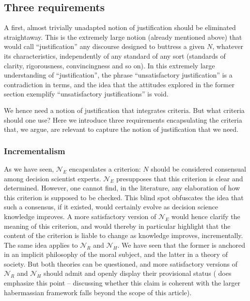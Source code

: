 \documentclass[preprint, french, english, 11pt, authoryear]{elsarticle}%
\begin{document}
\subsection{Three requirements}
A first, almost trivially unadapted notion of justification should be eliminated straightaway. This is the extremely large notion (already mentioned above) that would call ``justification'' any discourse designed to buttress a given $N$, whatever its characteristics, independently of any standard of any sort (standards of clarity, rigorousness, convincingness and so on). In this extremely large understanding of ``justification'', the phrase ``unsatisfactory justification'' is a contradiction in terms, and the idea that the attitudes explored in the former section exemplify ``unsatisfactory justifications'' is void.

We hence need a notion of justification that integrates criteria. But what criteria should one use? Here we introduce three requirements encapsulating the criteria that, we argue, are relevant to capture the notion of justification that we need.

\subsubsection{Incrementalism}
As we have seen, $\mathscr{N}_E$ encapsulates a criterion: $N$ should be considered consensual among decision scientist experts. $\mathscr{N}_E$ presupposes that this criterion is clear and determined. However, one cannot find, in the literature, any elaboration of how this criterion is supposed to be checked. This blind spot obfuscates the idea that such a consensus, if it existed, would certainly evolve as decision science knowledge improves. A more satisfactory version of $\mathscr{N}_E$ would hence clarify the meaning of this criterion, and would thereby in particular highlight that the content of the criterion is liable to change as knowledge improves, incrementally. The same idea applies to $\mathscr{N}_{R}$ and $\mathscr{N}_{H}$. We have seen that the former is anchored in an implicit philosophy of the moral subject, and the latter in a theory of society. But both theories can be questioned, and more satisfactory versions of $\mathscr{N}_{R}$ and $\mathscr{N}_{H}$ should admit and openly display their provisional status (\cite{habermas_moralbewustsein_1983} does emphasize this point -- discussing whether this claim is coherent with the larger habermassian framework falls beyond the scope of this article).
\end{document}
